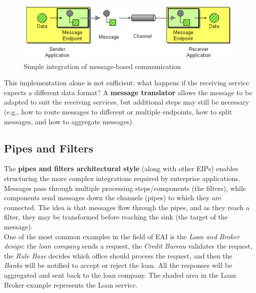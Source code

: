 \begin{figure} [H]
    \centering
    \includegraphics[width=1\textwidth]{images/SoftwareArchitecture/AEIsimpleintegration.png}
    \caption{Simple integration of message-based communication}
    \label{fig:AEIsimpleintegration}
\end{figure}

This implementation alone is not sufficient: what happens if the receiving service expects a different data format? A \textbf{message translator} allows the message to be adapted to suit the receiving services, but additional steps may still be necessary (e.g., how to route messages to different or multiple endpoints, how to split messages, and how to aggregate messages).

\newpage

\subsection{Pipes and Filters}

The \textbf{pipes and filters architectural style} (along with other EIPs) enables structuring the more complex integrations required by enterprise applications. Messages pass through multiple processing steps/components (the filters), while components send messages down the channels (pipes) to which they are connected. The idea is that messages flow through the pipes, and as they reach a filter, they may be transformed before reaching the sink (the target of the message). \\

One of the most common examples in the field of EAI is the \emph{Loan and Broker design}: the \emph{loan company} sends a request, the \emph{Credit Bureau} validates the request, the \emph{Rule Base} decides which office should process the request, and then the \emph{Banks} will be notified to accept or reject the loan. All the responses will be aggregated and sent back to the loan company. The shaded area in the Loan Broker example represents the Loan service.

